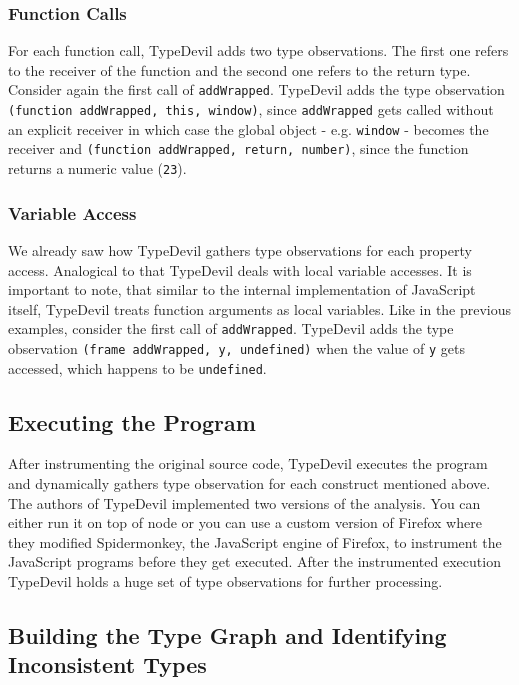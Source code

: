 \documentclass[runningheads,a4paper]{llncs}
\begin{document}
\subsubsection{Function Calls}
For each function call, TypeDevil adds two type observations.
The first one refers to the receiver of the function and the second one refers to the return type.
Consider again the first call of \lstinline[columns=fixed]{addWrapped}.
TypeDevil adds the type observation \lstinline[columns=fixed]{(function addWrapped, this, window)}, since \lstinline[columns=fixed]{addWrapped} gets called without an explicit receiver in which case the global object - e.g. \lstinline[columns=fixed]{window} - becomes the receiver
and \lstinline[columns=fixed]{(function addWrapped, return, number)}, since the function returns a numeric value (\lstinline[columns=fixed]{23}).

\subsubsection{Variable Access}
We already saw how TypeDevil gathers type observations for each property access.
Analogical to that TypeDevil deals with local variable accesses.
It is important to note, that similar to the internal implementation of JavaScript itself, TypeDevil treats function arguments as local variables.
Like in the previous examples, consider the first call of \lstinline[columns=fixed]{addWrapped}.
TypeDevil adds the type observation \lstinline[columns=fixed]{(frame addWrapped, y, undefined)} when the value of \lstinline[columns=fixed]{y} gets accessed, which happens to be \lstinline[columns=fixed]{undefined}.

\subsection{Executing the Program}
After instrumenting the original source code, TypeDevil executes the program and dynamically gathers type observation for each construct mentioned above.
The authors of TypeDevil implemented two versions of the analysis. 
You can either run it on top of node or you can use a custom version of Firefox where they modified Spidermonkey, the JavaScript engine of Firefox, to instrument the JavaScript programs before they get executed.
After the instrumented execution TypeDevil holds a huge set of type observations for further processing.

\subsection{Building the Type Graph and Identifying Inconsistent Types}
\label{TGs}
\end{document}
